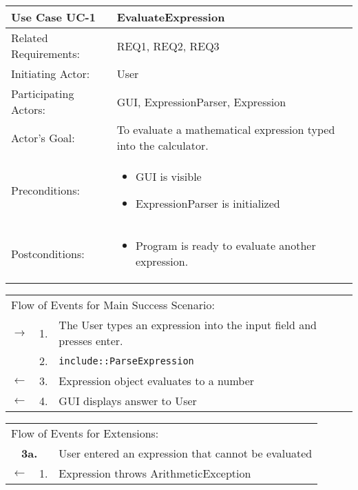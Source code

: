 \documentclass[11pt,letterpaper]{article}
\newcommand{\code}[1]{\texttt{#1}}
\begin{document}
\begin{center}
\begin{tabular}{p{1.5in}p{5in}}
\hline
\textbf{Use Case UC-1}     & \textbf{EvaluateExpression} \\ \hline
Related Requirements: & REQ1, REQ2, REQ3 \\
Initiating Actor:     & User \\
Participating Actors: & GUI, ExpressionParser, Expression \\
Actor's Goal:          & To evaluate a mathematical expression typed into the calculator. \\
Preconditions:         & \begin{itemize}[nosep]
                         \item GUI is visible
                         \item ExpressionParser is initialized
                         \end{itemize} \\
Postconditions:        & \begin{itemize}[nosep]
                         \item Program is ready to evaluate another expression.
                         \end{itemize} \\ \hline
\end{tabular}

\begin{tabular}{p{.25in}p{.25in}p{5.8in}}
\multicolumn{3}{l}{Flow of Events for Main Success Scenario:} \\
$\rightarrow$ & 1. & The User types an expression into the input field and presses enter. \\
            & 2. & \code{include::ParseExpression} \\ 
$\leftarrow$  & 3. & Expression object evaluates to a number \\
$\leftarrow$  & 4. & GUI displays answer to User \\
\end{tabular}

\begin{tabular}{p{.25in}p{.25in}p{5.8in}}
\multicolumn{3}{l}{Flow of Events for Extensions:} \\
\multicolumn{2}{c}{\textbf{3a.}} & User entered an expression that cannot be evaluated \\
$\leftarrow$  & 1.           & Expression throws ArithmeticException
\end{tabular}
\end{center}
\end{document}
